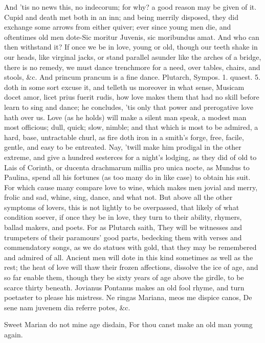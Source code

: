 {And 'tis no news this, no indecorum; for why? a good reason may be
given of it. Cupid and death met both in an inn; and being merrily
disposed, they did exchange some arrows from either quiver; ever since
young men die, and oftentimes old men dote-Sic moritur Juvenis,
sic moribundus amat. And who can then withstand it? If once we be in
love, young or old, though our teeth shake in our heads, like virginal
jacks, or stand parallel asunder like the arches of a bridge, there is
no remedy, we must dance trenchmore for a need, over tables, chairs,
and stools, \&c. And princum prancum is a fine dance. Plutarch, Sympos.
1. quaest. 5. doth in some sort excuse it, and telleth us moreover in
what sense, Musicam docet amor, licet prius fuerit rudis, how love
makes them that had no skill before learn to sing and dance; he
concludes, 'tis only that power and prerogative love hath over us.
Love (as he holds) will make a silent man speak, a modest man
most officious; dull, quick; slow, nimble; and that which is most to be
admired, a hard, base, untractable churl, as fire doth iron in a
smith's forge, free, facile, gentle, and easy to be entreated. Nay,
'twill make him prodigal in the other extreme, and give a hundred
sesterces for a night's lodging, as they did of old to Lais of Corinth,
or  ducenta drachmarum millia pro unica nocte, as Mundus to
Paulina, spend all his fortunes (as too many do in like case) to obtain
his suit. For which cause many compare love to wine, which makes men
jovial and merry, frolic and sad, whine, sing, dance, and what not.
But above all the other symptoms of lovers, this is not lightly to be
overpassed, that likely of what condition soever, if once they be in
love, they turn to their ability, rhymers, ballad makers, and poets.
For as Plutarch saith, They will be witnesses and trumpeters of
their paramours' good parts, bedecking them with verses and
commendatory songs, as we do statues with gold, that they may be
remembered and admired of all. Ancient men will dote in this kind
sometimes as well as the rest; the heat of love will thaw their frozen
affections, dissolve the ice of age, and so far enable them, though
they be sixty years of age above the girdle, to be scarce thirty
beneath. Jovianus Pontanus makes an old fool rhyme, and turn poetaster
to please his mistress.
Ne ringas Mariana, meos me dispice canos,
De sene nam juvenem dia referre potes, \&c.

Sweet Marian do not mine age disdain,
For thou canst make an old man young again.

}
